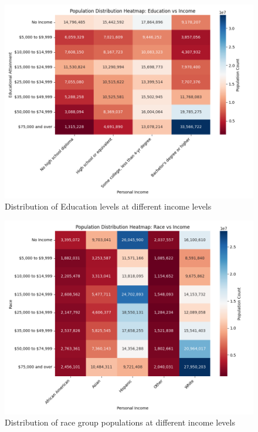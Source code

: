 \documentclass[journal]{IEEEtran}
\begin{document}
\begin{figure}[!htb]
	\centering
	\includegraphics[width=1\linewidth]{edu-income.png}
	\caption{Distribution of Education levels at different income levels}
	\label{fig:edu-income}
\end{figure}

\begin{figure}[!htb]
	\centering
	\includegraphics[width=1\linewidth]{race-income.png}
	\caption{Distribution of race group populations at different income levels}
	\label{fig:race-income}
\end{figure}
\end{document}

